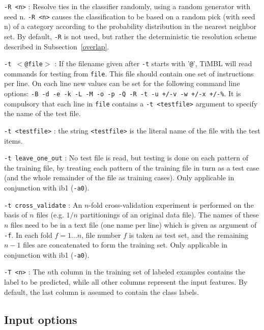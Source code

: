 \documentclass{book}
\begin{document}
\begin{description}
\item {\tt -R <n>} : Resolve ties in the classifier randomly, using a
random generator with seed n. {\tt -R <n>} causes the classification
to be based on a random pick (with seed n) of a category according to
the probability distribution in the nearest neighbor set. By default,
{\tt -R} is not used, but rather the deterministic tie resolution
scheme described in Subsection~\ref{overlap}.

\item {\tt -t $<$@file$>$} : If the filename given after {\tt -t} starts
with '{\tt @}', TiMBL will read commands for testing from {\tt file}.
This file should contain one set of instructions per line. On each
line new values can be set for the following command line options:
{\tt -B -d -e -k -L -M -o -p -Q -R -t -u +/-v -w +/-x +/-\%}. It is
compulsory that each line in {\tt file} contains a {\tt -t <testfile>}
argument to specify the name of the test file.

\item {\tt -t <testfile>} : the string {\tt <testfile>} is the literal name
of the file with the test items.

\item {\tt -t leave\_one\_out} : No test file is read, but testing is
done on each pattern of the training file, by treating each pattern of
the training file in turn as a test case (and the whole remainder of
the file as training cases). Only applicable in conjunction with {\sc ib1} ({\tt -a0}).

\item {\tt -t cross\_validate} : An $n$-fold cross-validation
experiment is performed on the basis of $n$ files (e.g. $1/n$
partitionings of an original data file). The names of these $n$ files
need to be in a text file (one name per line) which is given as
argument of {\tt -f}. In each fold $f=1 \ldots n$, file number $f$ is
taken as test set, and the remaining $n-1$ files are concatenated to
form the training set. Only applicable in conjunction with {\sc ib1} ({\tt -a0}).

\item {\tt -T <n>} : The $n$th column in the training set of labeled
  examples contains the label to be predicted, while all other columns
  represent the input features. By default, the last column is assumed
  to contain the class labels.

\end{description}

\subsection{Input options}
\end{document}
